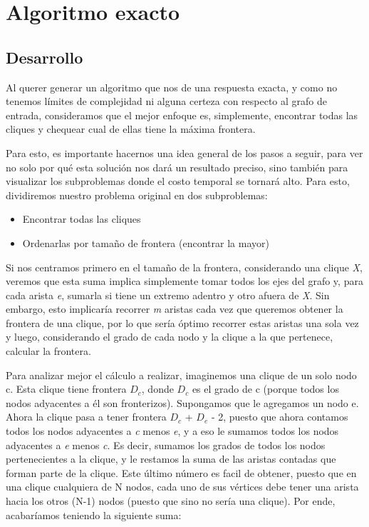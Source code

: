 \section{Algoritmo exacto}
\subsection{Desarrollo}
Al querer generar un algoritmo que nos de una respuesta exacta, y como no tenemos límites de complejidad ni alguna certeza con respecto al grafo de entrada, consideramos que el mejor enfoque es, simplemente, encontrar todas las cliques y chequear cual de ellas tiene la máxima frontera.

Para esto, es importante hacernos una idea general de los pasos a seguir, para ver no solo por qué esta solución nos dará un resultado preciso, sino también para visualizar los subproblemas donde el costo temporal se tornará alto. Para esto, dividiremos nuestro problema original en dos subproblemas:
\begin{itemize}
	\item Encontrar todas las cliques
	
	\item Ordenarlas por tamaño de frontera (encontrar la mayor)

\end{itemize}

Si nos centramos primero en el tamaño de la frontera, considerando una clique \textit{X}, veremos que esta suma implica simplemente tomar todos los ejes del grafo y, para cada arista \textit{e}, sumarla si tiene un extremo adentro y otro afuera de \textit{X}. Sin embargo, esto implicaría recorrer \textit{m} aristas cada vez que queremos obtener la frontera de una clique, por lo que sería óptimo recorrer estas aristas una sola vez y luego, considerando el grado de cada nodo y la clique a la que pertenece, calcular la frontera.

Para analizar mejor el cálculo a realizar, imaginemos una clique de un solo nodo c. Esta clique tiene frontera ${D_c}$, donde ${D_c}$ es el grado de c (porque todos los nodos adyacentes a él son fronterizos). Supongamos que le agregamos un nodo e. Ahora la clique pasa a tener frontera ${D_c}$ + ${D_e}$ - 2, puesto que ahora contamos todos los nodos adyacentes a \textit{c} menos \textit{e}, y a eso le sumamos todos los nodos adyacentes a \textit{e} menos \textit{c}. Es decir, sumamos los grados de todos los nodos pertenecientes a la clique, y le restamos la suma de las aristas contadas que forman parte de la clique. Este último número es facil de obtener, puesto que en una clique cualquiera de N nodos, cada uno de sus vértices debe tener una arista hacia los otros (N-1) nodos (puesto que sino no sería una clique). Por ende, acabaríamos teniendo la siguiente suma:

